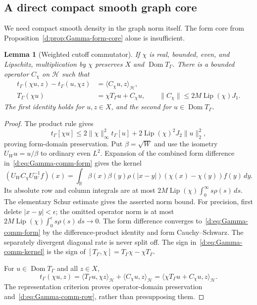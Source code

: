 \documentclass[11pt,a4paper]{article}
\numberwithin{equation}{section}
\newtheorem{lemma}[theorem]{Lemma}
\theoremstyle{definition}\newtheorem{definition}[theorem]{Definition}
\theoremstyle{remark}\newtheorem{remark}[theorem]{Remark}
\newcommand{\R}{\mathbb R}\newcommand{\C}{\mathbb C}\newcommand{\N}{\mathbb N}
\newcommand{\Hh}{\mathcal H}\newcommand{\Hw}{\mathcal H}
\newcommand{\tg}{t_\Gamma}\newcommand{\cg}{c_\Gamma}
\newcommand{\ip}[2]{\langle#1,#2\rangle}\newcommand{\norm}[1]{\lVert#1\rVert}\newcommand{\abs}[1]{\lvert#1\rvert}
\begin{document}
\subsection{A direct compact smooth graph core}\label{d:sec:Gamma-graph-core}

We need compact smooth density in the graph norm itself. The form core from Proposition~\ref{d:prop:Gamma-form-core} alone is insufficient.

\begin{lemma}[Weighted cutoff commutator]\label{d:lem:Gamma-commutator}
If $\chi$ is real, bounded, even, and Lipschitz, multiplication by $\chi$ preserves ${X}$ and $\operatorname{Dom}T_\Gamma$. There is a bounded operator $C_\chi$ on $\Hh$ such that
\begin{align}
 \tg(\chi u,z)-\tg(u,\chi z)
 &=\ip{C_\chi u}{z}_{\Hh},\label{d:eq:Gamma-comm-form}\\
 T_\Gamma(\chi u)&=\chi T_\Gamma u+C_\chi u,
 \qquad
 \norm{C_\chi}\le2M\operatorname{Lip}(\chi)J_1.
 \label{d:eq:Gamma-comm-row}
\end{align}
The first identity holds for $u,z\in{X}$, and the second for $u\in\operatorname{Dom}T_\Gamma$.
\end{lemma}
\begin{proof}
The product rule gives
\[
 \tg[\chi u]
 \le2\norm{\chi}_\infty^2\tg[u]
       +2\operatorname{Lip}(\chi)^2J_2\norm{u}_2^2,
\]
proving form-domain preservation. Put $\beta=\sqrt W$ and use the isometry $U_Wu=u/\beta$ to ordinary even $L^2$. Expansion of the combined form difference in~\eqref{d:eq:Gamma-comm-form} gives the kernel
\begin{equation}\label{d:eq:Gamma-comm-kernel}
 (U_W C_\chi U_W^{-1}f)(x)
 =\int_\R\beta(x)\beta(y)\rho(|x-y|)
                 (\chi(x)-\chi(y))f(y)\,dy.
\end{equation}
Its absolute row and column integrals are at most
$2M\operatorname{Lip}(\chi)\int_0^\infty s\rho(s)\,ds$.
The elementary Schur estimate gives the asserted norm bound. For precision, first delete $|x-y|<\epsilon$; the omitted operator norm is at most
$2M\operatorname{Lip}(\chi)\int_0^\epsilon s\rho(s)\,ds\to0$.
The form difference converges to~\eqref{d:eq:Gamma-comm-form} by the difference-product identity and form Cauchy--Schwarz. The separately divergent diagonal rate is never split off. The sign in~\eqref{d:eq:Gamma-comm-kernel} is the sign of $[T_\Gamma,\chi]=T_\Gamma\chi-\chi T_\Gamma$.

For $u\in\operatorname{Dom}T_\Gamma$ and all $z\in{X}$,
\[
 \tg(\chi u,z)
 =\ip{T_\Gamma u}{\chi z}_{\Hh}+\ip{C_\chi u}{z}_{\Hh}
 =\ip{\chi T_\Gamma u+C_\chi u}{z}_{\Hh}.
\]
The representation criterion proves operator-domain preservation and~\eqref{d:eq:Gamma-comm-row}, rather than presupposing them.
\end{proof}
\end{document}
